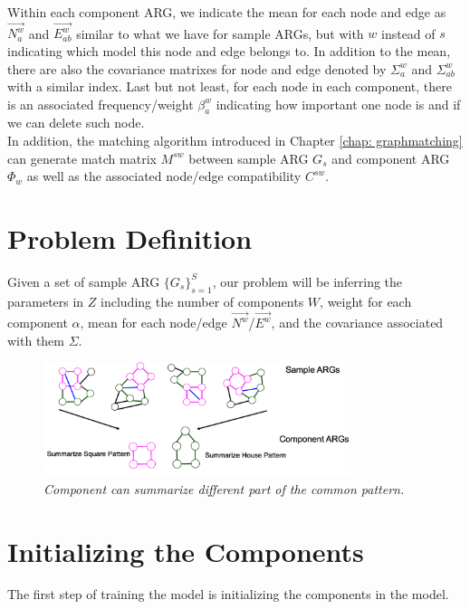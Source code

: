 Within each component ARG, we indicate the mean for each node and edge as $\overrightarrow{N^w_a}$ and $\overrightarrow{E^w_{ab}}$ similar to what we have for sample ARGs, but with $w$ instead of $s$ indicating which model this node and edge belongs to. In addition to the mean, there are also the covariance matrixes for node and edge denoted by $\Sigma^w_a$ and $\Sigma^w_{ab}$ with a similar index. Last but not least, for each node in each component, there is an associated frequency/weight $\beta^w_a$ indicating how important one node is and if we can delete such node.\\

In addition, the matching algorithm introduced in Chapter \ref{chap: graphmatching} can generate match matrix $M^{sw}$ between sample ARG $G_s$ and component ARG $\Phi_w$ as well as the associated node/edge compatibility $C^{sw}$.

\section{Problem Definition}

Given a set of sample ARG $\{G_s\}_{s=1}^S$, our problem will be inferring the parameters in $Z$ including the number of components $W$, weight for each component $\alpha$, mean for each node/edge $\overrightarrow{N^w}$/$\overrightarrow{E^w}$, and the covariance associated with them $\Sigma$.\\

\begin{figure}[h]
	\centering
	\captionsetup{justification=centering}
	\includegraphics[width=0.8\textwidth]{figs/component_summary.png}
	\caption[Caption for LOF]{\emph{Component can summarize different part of the common pattern.}}
	\label{fig:component_summary}
\end{figure}

\section{Initializing the Components}

The first step of training the model is initializing the components in the model.\\

